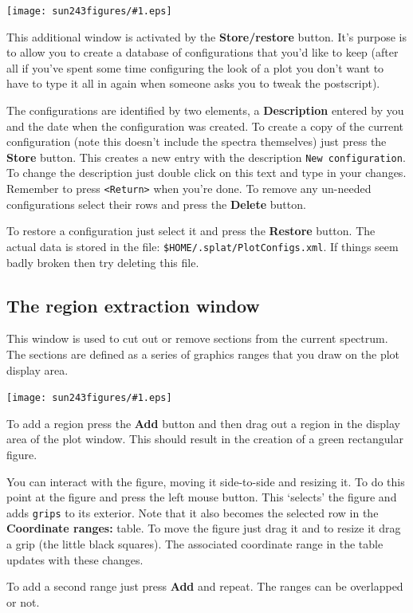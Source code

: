 \documentclass[twoside,11pt]{article}
\newcommand{\htmladdimg}[1]{}
\newcommand{\latexhtml}[2]{#1}
\renewcommand{\_}{\texttt{\symbol{95}}}
\newcommand{\mainfigure}[1]
{\begin{center}
 \latexhtml{\texttt{[image: sun243\_figures/\#1.eps]}}{\htmladdimg{#1.gif}}
 \end{center}
}
\newcommand{\labelitem}[1]{\textbf{#1}}
\newcommand{\hitext}[1]{\texttt{#1}}
\begin{document}
\mainfigure{restorewindow}

This additional window is activated by the \labelitem{Store/restore}
button. It's purpose is to allow you to create a database of configurations
that you'd like to keep (after all if you've spent some time configuring the
look of a plot you don't want to have to type it all in again when someone
asks you to tweak the postscript).

The configurations are identified by two elements, a
\labelitem{Description} entered by you and the date when the
configuration was created. To create a copy of the current configuration
(note this doesn't include the spectra themselves) just press the
\labelitem{Store} button. This creates a new entry with the description
\hitext{New configuration}. To change the description just double
click on this text and type in your changes. Remember to press
\hitext{<Return>} when you're done. To remove any un-needed
configurations select their rows and press the \labelitem{Delete}
button.

To restore a configuration just select it and press the
\labelitem{Restore} button. The actual data is stored in the file:
\hitext{\$HOME/.splat/PlotConfigs.xml}. If things seem badly broken
then try deleting this file.

\newpage
\subsection{The region extraction window}

This window is used to cut out or remove sections from the current
spectrum. The sections are defined as a series of graphics ranges that
you draw on the plot display area.

\mainfigure{cutterwindow}

To add a region press the \labelitem{Add} button and then drag out a
region in the display area of the plot window. This should result in
the creation of a green rectangular figure.

You can interact with the figure, moving it side-to-side and resizing
it. To do this point at the figure and press the left mouse
button. This `selects' the figure and adds \hitext{grips} to its
exterior. Note that it also becomes the selected row in the
\labelitem{Coordinate ranges:} table. To move the figure just drag it
and to resize it drag a grip (the little black squares). The
associated coordinate range in the table updates with these changes.

To add a second range just press \labelitem{Add} and repeat. The
ranges can be overlapped or not.
\end{document}
